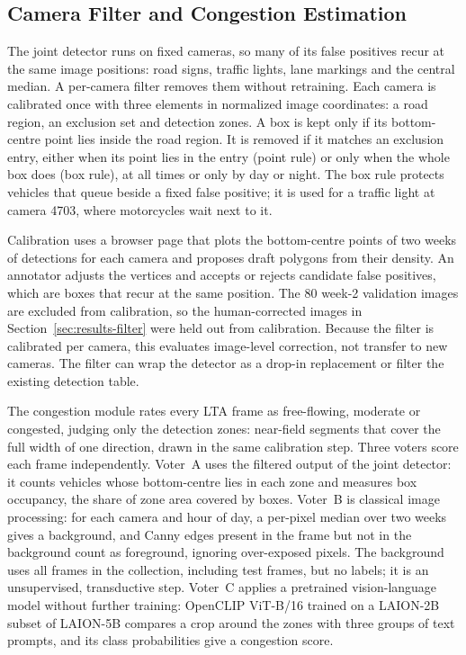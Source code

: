 \subsection{Camera Filter and Congestion Estimation}\label{sec:method-congestion}

The joint detector runs on fixed cameras, so many of its false positives recur
at the same image positions: road signs, traffic lights, lane markings and the
central median. A per-camera filter removes them without retraining. Each camera
is calibrated once with three elements in normalized image coordinates: a road
region, an exclusion set and detection zones. A box is kept only if its
bottom-centre point lies inside the road region. It is removed if it matches an
exclusion entry, either when its point lies in the entry (point rule) or only
when the whole box does (box rule), at all times or only by day or night. The
box rule protects vehicles that queue beside a fixed false positive; it is used
for a traffic light at camera 4703, where motorcycles wait next to it.

Calibration uses a browser page that plots the bottom-centre points of two weeks
of detections for each camera and proposes draft polygons from their density. An
annotator adjusts the vertices and accepts or rejects candidate false positives,
which are boxes that recur at the same position. The 80 week-2 validation images
are excluded from calibration, so the human-corrected images in
Section~\ref{sec:results-filter} were held out from calibration. Because the
filter is calibrated per camera, this evaluates image-level correction, not
transfer to new cameras. The filter can wrap the detector as a drop-in
replacement or filter the existing detection table.

The congestion module rates every LTA frame as free-flowing, moderate or
congested, judging only the detection zones: near-field segments that cover the
full width of one direction, drawn in the same calibration step. Three voters
score each frame independently. Voter~A uses the filtered output of the joint
detector: it counts vehicles whose bottom-centre lies in each zone and measures
box occupancy, the share of zone area covered by boxes. Voter~B is classical
image processing: for each camera and hour of day, a per-pixel median over two
weeks gives a background, and Canny edges \parencite{canny1986edge} present in
the frame but not in the background count as foreground, ignoring over-exposed
pixels. The background uses all frames in the collection, including test frames,
but no labels; it is an unsupervised, transductive step. Voter~C applies a
pretrained vision-language model without further
training: OpenCLIP ViT-B/16 trained on a LAION-2B subset of LAION-5B
\parencite{radford2021clip,cherti2023openclip,schuhmann2022laion} compares a
crop around the zones with three groups of text prompts, and its class
probabilities give a congestion score.

